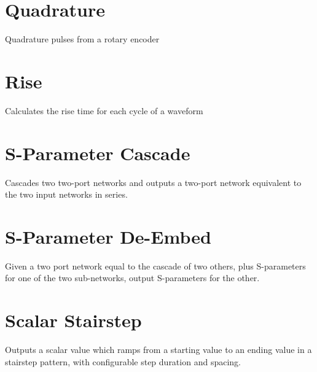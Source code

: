 \pagebreak
\section{Quadrature}

Quadrature pulses from a rotary encoder

\pagebreak
\section{Rise}

Calculates the rise time for each cycle of a waveform

\pagebreak
\section{S-Parameter Cascade}
\label{filter:sparamcascade}

Cascades two two-port networks and outputs a two-port network equivalent to the two input networks in series.

\pagebreak
\section{S-Parameter De-Embed}

Given a two port network equal to the cascade of two others, plus S-parameters for one of the two sub-networks, output
S-parameters for the other.

\pagebreak
\section{Scalar Stairstep}

Outputs a scalar value which ramps from a starting value to an ending value in a stairstep pattern, with configurable
step duration and spacing.

\pagebreak
